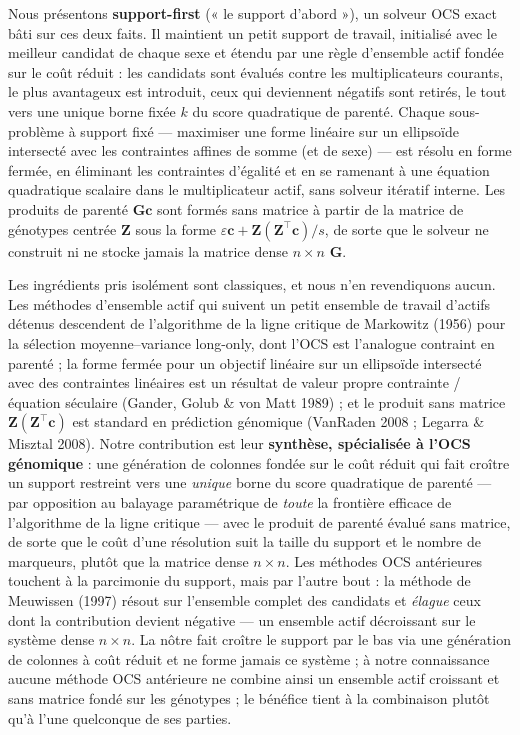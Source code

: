 \documentclass[11pt]{article}
\newcommand{\tp}{^{\top}}
\newcommand{\bc}{\mathbf{c}}
\newcommand{\bG}{\mathbf{G}}
\newcommand{\bZ}{\mathbf{Z}}
\begin{document}
Nous présentons \textbf{support-first} (« le support d'abord »), un solveur OCS exact bâti sur ces deux faits. Il maintient un petit support de travail, initialisé avec le meilleur candidat de chaque sexe et étendu par une règle d'ensemble actif fondée sur le coût réduit : les candidats sont évalués contre les multiplicateurs courants, le plus avantageux est introduit, ceux qui deviennent négatifs sont retirés, le tout vers une unique borne fixée $k$ du score quadratique de parenté. Chaque sous-problème à support fixé --- maximiser une forme linéaire sur un ellipsoïde intersecté avec les contraintes affines de somme (et de sexe) --- est résolu en forme fermée, en éliminant les contraintes d'égalité et en se ramenant à une équation quadratique scalaire dans le multiplicateur actif, sans solveur itératif interne. Les produits de parenté $\bG\bc$ sont formés sans matrice à partir de la matrice de génotypes centrée $\bZ$ sous la forme $\varepsilon\bc + \bZ(\bZ\tp\bc)/s$, de sorte que le solveur ne construit ni ne stocke jamais la matrice dense $n\times n$ $\bG$.

Les ingrédients pris isolément sont classiques, et nous n'en revendiquons aucun. Les méthodes d'ensemble actif qui suivent un petit ensemble de travail d'actifs détenus descendent de l'algorithme de la ligne critique de Markowitz (1956) pour la sélection moyenne--variance long-only, dont l'OCS est l'analogue contraint en parenté ; la forme fermée pour un objectif linéaire sur un ellipsoïde intersecté avec des contraintes linéaires est un résultat de valeur propre contrainte / équation séculaire (Gander, Golub \& von Matt 1989) ; et le produit sans matrice $\bZ(\bZ\tp\bc)$ est standard en prédiction génomique (VanRaden 2008 ; Legarra \& Misztal 2008). Notre contribution est leur \textbf{synthèse, spécialisée à l'OCS génomique} : une génération de colonnes fondée sur le coût réduit qui fait croître un support restreint vers une \emph{unique} borne du score quadratique de parenté --- par opposition au balayage paramétrique de \emph{toute} la frontière efficace de l'algorithme de la ligne critique --- avec le produit de parenté évalué sans matrice, de sorte que le coût d'une résolution suit la taille du support et le nombre de marqueurs, plutôt que la matrice dense $n\times n$. Les méthodes OCS antérieures touchent à la parcimonie du support, mais par l'autre bout : la méthode de Meuwissen (1997) résout sur l'ensemble complet des candidats et \emph{élague} ceux dont la contribution devient négative --- un ensemble actif décroissant sur le système dense $n\times n$. La nôtre fait croître le support par le bas via une génération de colonnes à coût réduit et ne forme jamais ce système ; à notre connaissance aucune méthode OCS antérieure ne combine ainsi un ensemble actif croissant et sans matrice fondé sur les génotypes ; le bénéfice tient à la combinaison plutôt qu'à l'une quelconque de ses parties.
\end{document}
